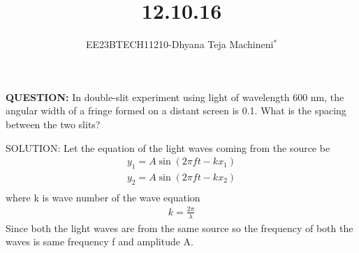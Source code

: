 \documentclass[journal,12pt,twocolumn]{IEEEtran}
\theoremstyle{remark}
\begin{document}

\vspace{3cm}
\title{\textbf{12.10.16}}
\author{EE23BTECH11210-Dhyana Teja Machineni$^{*}$%
}
\maketitle
\newpage
\bigskip

\textbf{QUESTION:}
In double-slit experiment using light of wavelength 600 nm, the
angular width of a fringe formed on a distant screen is 0.1\degree. What is
the spacing between the two slits?

SOLUTION:
Let the equation of the light waves coming from the source be
\begin{align}
y_1=A \sin(2\pi f t-k x_1)\\
y_2=A \sin(2\pi f t-k x_2)\\
\end{align}
where k is wave number of the wave equation
\begin{align}
k =\frac{2\pi}{\lambda}
\end{align}
Since both the light waves are from the same source so the frequency of both the waves is same frequency f and amplitude A.
\end{document}
